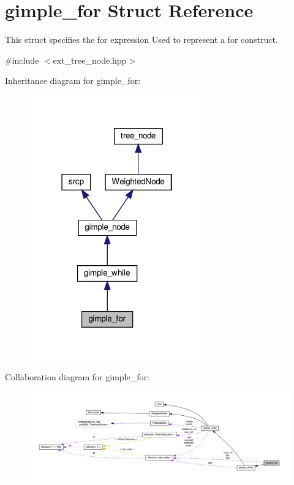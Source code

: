 \hypertarget{structgimple__for}{}\section{gimple\+\_\+for Struct Reference}
\label{structgimple__for}


This struct specifies the for expression Used to represent a for construct.  




{\ttfamily \#include $<$ext\+\_\+tree\+\_\+node.\+hpp$>$}



Inheritance diagram for gimple\+\_\+for\+:
\nopagebreak
\begin{figure}[H]
\begin{center}
\leavevmode
\includegraphics[width=214pt]{d0/dd4/structgimple__for__inherit__graph}
\end{center}
\end{figure}


Collaboration diagram for gimple\+\_\+for\+:
\nopagebreak
\begin{figure}[H]
\begin{center}
\leavevmode
\includegraphics[width=350pt]{d7/d8c/structgimple__for__coll__graph}
\end{center}
\end{figure}
